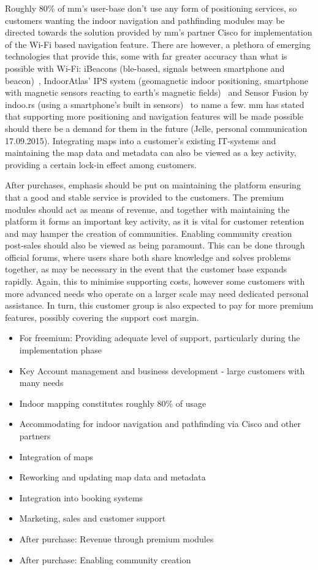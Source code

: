 Roughly 80\% of \gls{mm}'s user-base don't use any form of positioning services, so customers wanting the indoor navigation and pathfinding modules may be directed towards the solution provided by \gls{mm}'s partner Cisco for implementation of the Wi-Fi based navigation feature. There are however, a plethora of emerging technologies that provide this, some with far greater accuracy than what is possible with Wi-Fi: iBeacons (\gls{ble}-based, signals between smartphone and beacon)~\cite{ibeacon2016}, IndoorAtlas' IPS system (geomagnetic indoor positioning, smartphone with magnetic sensors reacting to earth's magnetic fields)~\cite{indooratlas2016} and Sensor Fusion by indoo.rs (using a smartphone's built in sensors)~\cite{indoo.rs2016} to name a few. \gls{mm} has stated that supporting more positioning and navigation features will be made possible should there be a demand for them in the future (Jelle, personal communication 17.09.2015). Integrating maps into a customer's existing IT-systems and maintaining the map data and metadata can also be viewed as a key activity, providing a certain lock-in effect among customers. 


After purchases, emphasis should be put on maintaining the platform ensuring that a good and stable service is provided to the customers. The premium modules should act as means of revenue, and together with maintaining the platform it forms an important key activity, as it is vital for customer retention and may hamper the creation of communities. Enabling community creation post-sales should also be viewed as being paramount. This can be done through official forums, where users share both share knowledge and solves problems together, as may be necessary in the event that the customer base expands rapidly. Again, this to minimise supporting costs, however some customers with more advanced needs who operate on a larger scale may need dedicated personal assistance. In turn, this customer group is also expected to pay for more premium features, possibly covering the support cost margin.

\begin{itemize}
    \item For freemium: Providing adequate level of support, particularly during the implementation phase
    \item Key Account management and business development - large customers with many needs
    \item Indoor mapping constitutes roughly 80\% of usage
    \item Accommodating for indoor navigation and pathfinding via Cisco and other partners
    \item Integration of maps
    \item Reworking and updating map data and metadata
    \item Integration into booking systems
    \item Marketing, sales and customer support
    \item After purchase: Revenue through premium modules
    \item After purchase: Enabling community creation 
\end{itemize}

